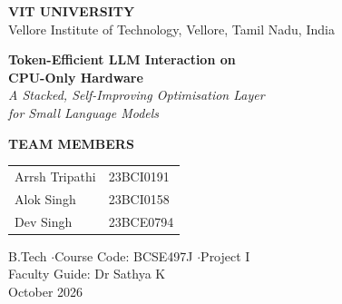 \documentclass[11pt,a4paper]{article}
\begin{document}
\thispagestyle{empty}
\begin{center}
  \vspace*{0.4cm}
  {\large\bfseries VIT UNIVERSITY}\\[2pt]
  {\small Vellore Institute of Technology, Vellore, Tamil Nadu, India}

  \vspace{1.5cm}
  {\LARGE\bfseries Token-Efficient LLM Interaction on\\[5pt]
   CPU-Only Hardware}\\[12pt]
  {\large\itshape A Stacked, Self-Improving Optimisation Layer\\
   for Small Language Models}

  \vspace{1.1cm}
  {\small\textcolor{accent}{\textbf{TEAM MEMBERS}}}\\[7pt]
  \begin{tabular}{ll}
    Arrsh Tripathi & 23BCI0191 \\
    Alok Singh     & 23BCI0158 \\
    Dev Singh      & 23BCE0794 \\
  \end{tabular}

  \vspace{0.9cm}
  {\small B.Tech \quad$\cdot$\quad Course Code: BCSE497J \quad$\cdot$\quad Project I}\\[3pt]
  {\small Faculty Guide: Dr Sathya K}\\[3pt]
  {\small October 2026}
\end{center}

\vspace{0.6cm}
\end{document}
